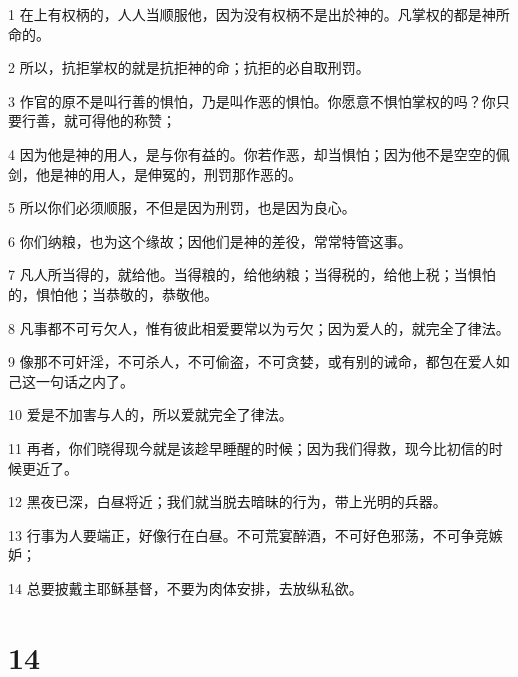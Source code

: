 \par 1 在上有权柄的，人人当顺服他，因为没有权柄不是出於神的。凡掌权的都是神所命的。
\par 2 所以，抗拒掌权的就是抗拒神的命；抗拒的必自取刑罚。
\par 3 作官的原不是叫行善的惧怕，乃是叫作恶的惧怕。你愿意不惧怕掌权的吗？你只要行善，就可得他的称赞；
\par 4 因为他是神的用人，是与你有益的。你若作恶，却当惧怕；因为他不是空空的佩剑，他是神的用人，是伸冤的，刑罚那作恶的。
\par 5 所以你们必须顺服，不但是因为刑罚，也是因为良心。
\par 6 你们纳粮，也为这个缘故；因他们是神的差役，常常特管这事。
\par 7 凡人所当得的，就给他。当得粮的，给他纳粮；当得税的，给他上税；当惧怕的，惧怕他；当恭敬的，恭敬他。
\par 8 凡事都不可亏欠人，惟有彼此相爱要常以为亏欠；因为爱人的，就完全了律法。
\par 9 像那不可奸淫，不可杀人，不可偷盗，不可贪婪，或有别的诫命，都包在爱人如己这一句话之内了。
\par 10 爱是不加害与人的，所以爱就完全了律法。
\par 11 再者，你们晓得现今就是该趁早睡醒的时候；因为我们得救，现今比初信的时候更近了。
\par 12 黑夜已深，白昼将近；我们就当脱去暗昧的行为，带上光明的兵器。
\par 13 行事为人要端正，好像行在白昼。不可荒宴醉酒，不可好色邪荡，不可争竞嫉妒；
\par 14 总要披戴主耶稣基督，不要为肉体安排，去放纵私欲。

\chapter{14}

